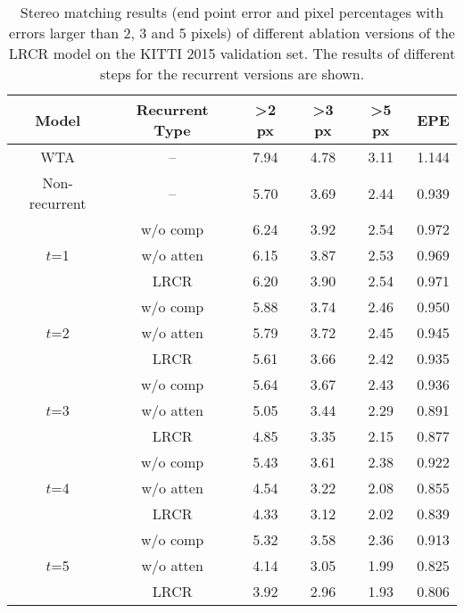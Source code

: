 \documentclass[10pt,twocolumn,letterpaper]{article}
\begin{document}
 \begin{table}
	\small
	\setlength{\tabcolsep}{2.5pt}
	\renewcommand{\arraystretch}{1}
	\centering
	\caption{\small Stereo matching results (end point error and pixel percentages with errors larger than 2, 3 and 5 pixels) of different ablation versions of the LRCR model on the KITTI 2015 validation set. The results of different steps for the recurrent versions are shown.}
	\vspace{-0.2cm}
	\begin{tabular}{c||c|c|c|c|c}
		
	   Model	& Recurrent Type & \textgreater 2 px& \textgreater 3 px & \textgreater 5 px & EPE  \\
		
		\hline
		WTA & -- &7.94 & 4.78 & 3.11 & 1.144  \\
		\hline
		Non-recurrent & -- & 5.70 & 3.69 & 2.44 & 0.939    \\ 
		\hline
		\multirow{3}{*}{$t$=1}  & w/o comp & 6.24 & 3.92 & 2.54 & 0.972   \\
		& w/o atten & 6.15 &  3.87 & 2.53 & 0.969   \\
		& LRCR  & 6.20 & 3.90 & 2.54 & 0.971 \\ \hline
		\multirow{3}{*}{$t$=2}  & w/o comp & 5.88 & 3.74  & 2.46 & 0.950\\
		& w/o atten & 5.79& 3.72& 2.45 & 0.945\\
		& LRCR & 5.61 & 3.66 &2.42 &0.935 \\   \hline
		\multirow{3}{*}{$t$=3} & w/o comp & 5.64 & 3.67 & 2.43& 0.936\\
		& w/o atten & 5.05& 3.44& 2.29 & 0.891 \\
		& LRCR & 4.85 & 3.35 & 2.15 & 0.877   \\ \hline
		\multirow{3}{*}{$t$=4} 	& w/o comp & 5.43& 3.61& 2.38& 0.922\\
		& w/o atten & 4.54& 3.22& 2.08& 0.855\\  
		& LRCR  & 4.33 & 3.12  & 2.02  & 0.839   \\  \hline
		\multirow{3}{*}{$t$=5} 	& w/o comp & 5.32 & 3.58& 2.36& 0.913\\
		& w/o atten & 4.14& 3.05& 1.99& 0.825\\  	                        
		&LRCR    & 3.92 & 2.96  & 1.93  & 0.806   \\
		\hline
	\end{tabular}
	\label{tab:KITTI1}%
	\vspace{-0.6cm}
\end{table}
\end{document}
